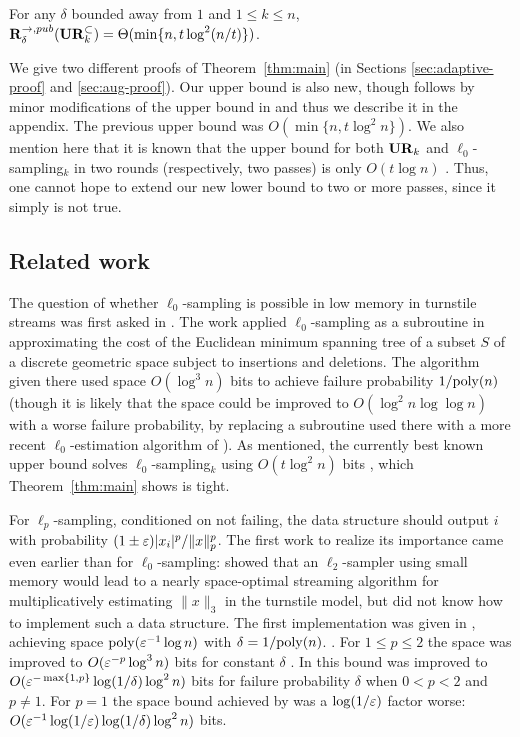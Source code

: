 \begin{theorem}\label{thm:main}
For any $\delta$ bounded away from $1$ and $1\le k\le n$, $\mathbf{R}^{\rightarrow,pub}_\delta(\mathbf{UR}_k^\subset) = \Theta(\min\{n, t\log^2(n/t)\})$.
\end{theorem}

We give two different proofs of Theorem~\ref{thm:main} (in Sections \ref{sec:adaptive-proof} and \ref{sec:aug-proof}). Our upper bound is also new, though follows by minor modifications of the upper bound in \cite{JowhariST11} and thus we describe it in the appendix. The previous upper bound was $O(\min\{n, t\log^2 n\})$. We also mention here that it is known that the upper bound for both $\mathbf{UR}_k$ and $\ell_0$-sampling$_k$ in two rounds (respectively, two passes) is only $O(t\log n)$ \cite{JowhariST11}. Thus, one cannot hope to extend our new lower bound to two or more passes, since it simply is not true.


\vspace{-.1in}\subsection{Related work}
The question of whether $\ell_0$-sampling is possible in low memory in turnstile streams was first asked in \cite{CormodeMR05,FrahlingIS08}. The work \cite{FrahlingIS08} applied $\ell_0$-sampling as a subroutine in approximating the cost of the Euclidean minimum spanning tree of a subset $S$ of a discrete geometric space subject to insertions and deletions. The algorithm given there used space $O(\log^3 n)$ bits to achieve failure probability $1/{\mathrm{poly}}(n)$ (though it is likely that the space could be improved to $O(\log^2 n\log\log n)$ with a worse failure probability, by replacing a subroutine used there with a more recent $\ell_0$-estimation algorithm of \cite{KaneNW10}). As mentioned, the currently best known upper bound solves $\ell_0$-sampling$_k$ using $O(t\log^2 n)$ bits \cite{JowhariST11}, which Theorem~\ref{thm:main} shows is tight.

For $\ell_p$-sampling, conditioned on not failing, the data structure should output $i$ with probability $(1\pm\varepsilon)|x_i|^p/\|x\|_p^p$. The first work to realize its importance came even earlier than for $\ell_0$-sampling: \cite{CoppersmithK04} showed that an $\ell_2$-sampler using small memory would lead to a nearly space-optimal streaming algorithm for multiplicatively estimating $\|x\|_3$ in the turnstile model, but did not know how to implement such a data structure. The first implementation was given in \cite{MonemizadehW10}, achieving space ${\mathrm{poly}}(\varepsilon^{-1}\log n)$ with $\delta = 1/{\mathrm{poly}}(n)$. . For $1\le p\le 2$ the space was improved to $O(\varepsilon^{-p}\log^3 n)$ bits for constant $\delta$ \cite{AndoniKO11}. In \cite{JowhariST11} this bound was improved to $O(\varepsilon^{-\max\{1,p\}}\log(1/\delta)\log^2 n)$ bits for failure probability $\delta$ when $0<p<2$ and $p\neq 1$. For $p=1$ the space bound achieved by \cite{JowhariST11} was a $\log(1/\varepsilon)$ factor worse: $O(\varepsilon^{-1}\log(1/\varepsilon)\log(1/\delta)\log^2 n)$ bits.

